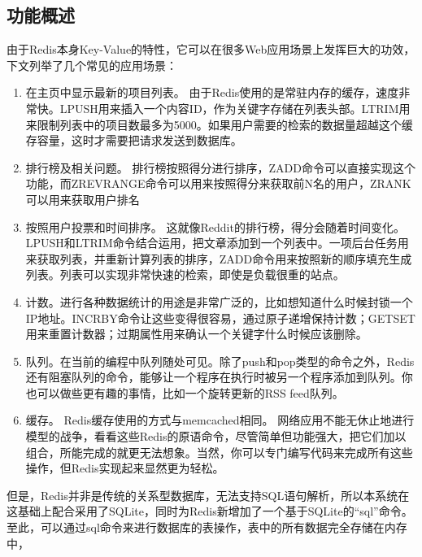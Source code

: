 \documentclass{zjutthesis}
\begin{document}
\subsection{功能概述}
由于Redis本身Key-Value的特性，它可以在很多Web应用场景上发挥巨大的功效，下文列举了几个常见的应用场景：
\begin{enumerate}[label=（\arabic*）]
\item{在主页中显示最新的项目列表。
由于Redis使用的是常驻内存的缓存，速度非常快。LPUSH用来插入一个内容ID，作为关键字存储在列表头部。LTRIM用来限制列表中的项目数最多为5000。如果用户需要的检索的数据量超越这个缓存容量，这时才需要把请求发送到数据库。}

\item{排行榜及相关问题。
排行榜按照得分进行排序，ZADD命令可以直接实现这个功能，而ZREVRANGE命令可以用来按照得分来获取前N名的用户，ZRANK可以用来获取用户排名}

\item{按照用户投票和时间排序。
这就像Reddit的排行榜，得分会随着时间变化。LPUSH和LTRIM命令结合运用，把文章添加到一个列表中。一项后台任务用来获取列表，并重新计算列表的排序，ZADD命令用来按照新的顺序填充生成列表。列表可以实现非常快速的检索，即使是负载很重的站点。}

\item{计数。进行各种数据统计的用途是非常广泛的，比如想知道什么时候封锁一个IP地址。INCRBY命令让这些变得很容易，通过原子递增保持计数；GETSET用来重置计数器；过期属性用来确认一个关键字什么时候应该删除。}

\item{队列。在当前的编程中队列随处可见。除了push和pop类型的命令之外，Redis还有阻塞队列的命令，能够让一个程序在执行时被另一个程序添加到队列。你也可以做些更有趣的事情，比如一个旋转更新的RSS feed队列。}

\item{缓存。
Redis缓存使用的方式与memcached相同。
网络应用不能无休止地进行模型的战争，看看这些Redis的原语命令，尽管简单但功能强大，把它们加以组合，所能完成的就更无法想象。当然，你可以专门编写代码来完成所有这些操作，但Redis实现起来显然更为轻松。}
\end{enumerate}

但是，Redis并非是传统的关系型数据库，无法支持SQL语句解析，所以本系统在这基础上配合采用了SQLite，同时为Redis新增加了一个基于SQLite的“sql”命令。至此，可以通过sql命令来进行数据库的表操作，表中的所有数据完全存储在内存中，

\backmatter


\nocite{*}                                   %


\appendix

\end{document}
